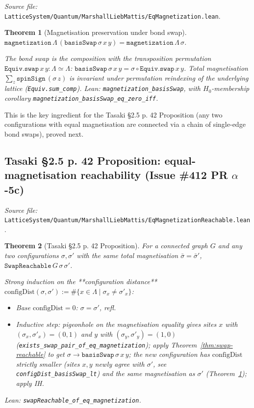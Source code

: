 \documentclass[a4paper,11pt]{article}
\newtheorem{theorem}{Theorem}
\begin{document}
\emph{Source file:}
\texttt{LatticeSystem/Quantum/MarshallLiebMattis/EqMagnetization.lean}.

\begin{theorem}[Magnetisation preservation under bond swap]
\label{thm:mag-swap}
$\texttt{magnetization}\,\Lambda\,(\texttt{basisSwap}\,\sigma\,x\,y) =
 \texttt{magnetization}\,\Lambda\,\sigma$.

The bond swap is the composition with the transposition permutation
$\texttt{Equiv.swap}\,x\,y : \Lambda \simeq \Lambda$:
$\texttt{basisSwap}\,\sigma\,x\,y = \sigma \circ \texttt{Equiv.swap}\,x\,y$.
Total magnetisation $\sum_z \texttt{spinSign}\,(\sigma\,z)$ is
invariant under permutation reindexing of the underlying lattice
(\texttt{Equiv.sum\_comp}). Lean: \texttt{magnetization\_basisSwap},
with $H_0$-membership corollary
\texttt{magnetization\_basisSwap\_eq\_zero\_iff}.
\end{theorem}

This is the key ingredient for the Tasaki §2.5 p. 42 Proposition
(any two configurations with equal magnetisation are connected via
a chain of single-edge bond swaps), proved next.

\subsection{Tasaki §2.5 p. 42 Proposition: equal-magnetisation
reachability (Issue \#412 PR $\alpha$-5c)}
\label{ssec:mlm-eq-magnetization-reachable}

\emph{Source file:}
\texttt{LatticeSystem/Quantum/MarshallLiebMattis/EqMagnetizationReachable.lean}.

\begin{theorem}[Tasaki §2.5 p. 42 Proposition]
\label{thm:eq-mag-reachable}
For a connected graph $G$ and any two configurations
$\sigma, \sigma'$ with the same total magnetisation
$\bar\sigma = \bar\sigma'$,
$\texttt{SwapReachable}\,G\,\sigma\,\sigma'$.

Strong induction on the **configuration distance**
$\mathrm{configDist}(\sigma, \sigma') :=
 \#\{x \in \Lambda \mid \sigma_x \neq \sigma'_x\}$:
\begin{itemize}
\item Base $\mathrm{configDist} = 0$: $\sigma = \sigma'$, refl.
\item Inductive step: pigeonhole on the magnetisation equality
gives sites $x$ with $(\sigma_x, \sigma'_x) = (0, 1)$ and $y$ with
$(\sigma_y, \sigma'_y) = (1, 0)$
(\texttt{exists\_swap\_pair\_of\_eq\_magnetization}); apply
Theorem~\ref{thm:swap-reachable} to get $\sigma \to
\texttt{basisSwap}\,\sigma\,x\,y$; the new configuration has
$\mathrm{configDist}$ strictly smaller (sites $x, y$ newly agree
with $\sigma'$, see \texttt{configDist\_basisSwap\_lt}) and the
same magnetisation as $\sigma'$
(Theorem~\ref{thm:mag-swap}); apply IH.
\end{itemize}
Lean: \texttt{swapReachable\_of\_eq\_magnetization}.
\end{theorem}
\end{document}
